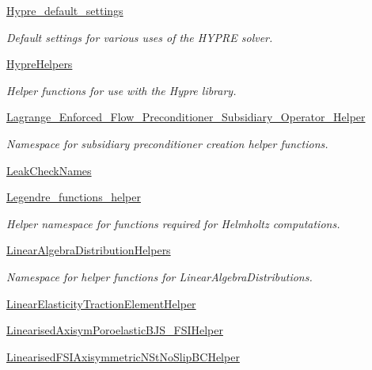 \begin{DoxyCompactItemize}
 \hyperlink{namespaceoomph_1_1Hypre__default__settings}{Hypre\+\_\+default\+\_\+settings}
\begin{DoxyCompactList}\small\item\em Default settings for various uses of the H\+Y\+P\+RE solver. \end{DoxyCompactList}\item 
 \hyperlink{namespaceoomph_1_1HypreHelpers}{Hypre\+Helpers}
\begin{DoxyCompactList}\small\item\em Helper functions for use with the Hypre library. \end{DoxyCompactList}\item 
 \hyperlink{namespaceoomph_1_1Lagrange__Enforced__Flow__Preconditioner__Subsidiary__Operator__Helper}{Lagrange\+\_\+\+Enforced\+\_\+\+Flow\+\_\+\+Preconditioner\+\_\+\+Subsidiary\+\_\+\+Operator\+\_\+\+Helper}
\begin{DoxyCompactList}\small\item\em Namespace for subsidiary preconditioner creation helper functions. \end{DoxyCompactList}\item 
 \hyperlink{namespaceoomph_1_1LeakCheckNames}{Leak\+Check\+Names}
\item 
 \hyperlink{namespaceoomph_1_1Legendre__functions__helper}{Legendre\+\_\+functions\+\_\+helper}
\begin{DoxyCompactList}\small\item\em Helper namespace for functions required for Helmholtz computations. \end{DoxyCompactList}\item 
 \hyperlink{namespaceoomph_1_1LinearAlgebraDistributionHelpers}{Linear\+Algebra\+Distribution\+Helpers}
\begin{DoxyCompactList}\small\item\em Namespace for helper functions for Linear\+Algebra\+Distributions. \end{DoxyCompactList}\item 
 \hyperlink{namespaceoomph_1_1LinearElasticityTractionElementHelper}{Linear\+Elasticity\+Traction\+Element\+Helper}
\item 
 \hyperlink{namespaceoomph_1_1LinearisedAxisymPoroelasticBJS__FSIHelper}{Linearised\+Axisym\+Poroelastic\+B\+J\+S\+\_\+\+F\+S\+I\+Helper}
\item 
 \hyperlink{namespaceoomph_1_1LinearisedFSIAxisymmetricNStNoSlipBCHelper}{Linearised\+F\+S\+I\+Axisymmetric\+N\+St\+No\+Slip\+B\+C\+Helper}

\end{DoxyCompactItemize}
